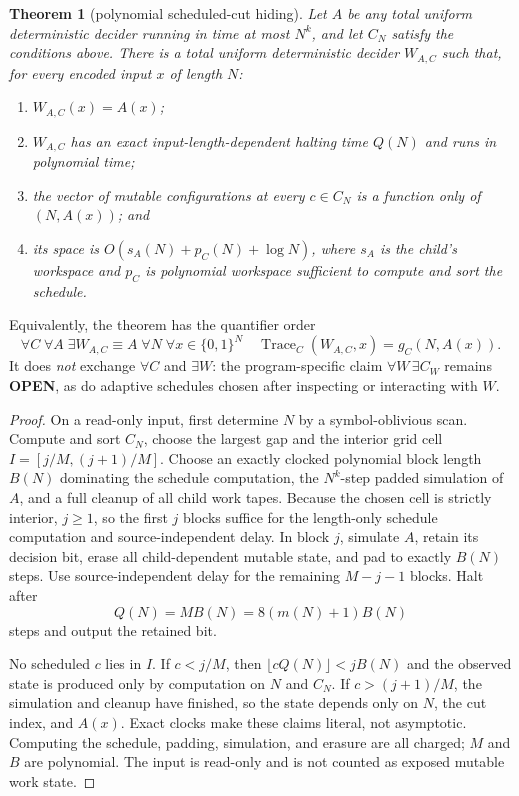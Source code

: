 \documentclass[11pt]{article}
\newtheorem{theorem}{Theorem}
\newcommand{\OPEN}{\textbf{OPEN}}
\begin{document}
\begin{theorem}[polynomial scheduled-cut hiding]
Let $A$ be any total uniform deterministic decider running in time at most $N^k$, and let
$C_N$ satisfy the conditions above.  There is a total uniform deterministic decider
$W_{A,C}$ such that, for every encoded input $x$ of length $N$:
\begin{enumerate}
\item $W_{A,C}(x)=A(x)$;
\item $W_{A,C}$ has an exact input-length-dependent halting time $Q(N)$ and runs in
polynomial time;
\item the vector of mutable configurations at every $c\in C_N$ is a function only of
$(N,A(x))$; and
\item its space is $O(s_A(N)+p_C(N)+\log N)$, where $s_A$ is the child's workspace and
$p_C$ is polynomial workspace sufficient to compute and sort the schedule.
\end{enumerate}
\end{theorem}
Equivalently, the theorem has the quantifier order
\[
 \forall C\;\forall A\;\exists W_{A,C}\equiv A\;\forall N\;\forall x\in\{0,1\}^N
 \quad \operatorname{Trace}_{C}(W_{A,C},x)=g_C(N,A(x)).
\]
It does \emph{not} exchange $\forall C$ and $\exists W$: the program-specific claim
$\forall W\,\exists C_W$ remains \OPEN, as do adaptive schedules chosen after inspecting
or interacting with $W$.

\begin{proof}
On a read-only input, first determine $N$ by a symbol-oblivious scan.  Compute and sort
$C_N$, choose the largest gap and the interior grid cell
$I=[j/M,(j+1)/M]$.  Choose an exactly clocked polynomial block length $B(N)$ dominating
the schedule computation, the $N^k$-step padded simulation of $A$, and a full cleanup of
all child work tapes.  Because the chosen cell is strictly interior, $j\ge1$, so the
first $j$ blocks suffice for the length-only schedule computation and source-independent
delay.  In block $j$, simulate $A$, retain its decision bit, erase all child-dependent
mutable state, and pad to exactly $B(N)$ steps.  Use source-independent delay for the
remaining $M-j-1$ blocks.  Halt after
\[
 Q(N)=M B(N)=8(m(N)+1)B(N)
\]
steps and output the retained bit.

No scheduled $c$ lies in $I$.  If $c<j/M$, then
$\lfloor cQ(N)\rfloor<jB(N)$ and the observed state is produced only by computation on
$N$ and $C_N$.  If $c>(j+1)/M$, the simulation and cleanup have finished, so the state
depends only on $N$, the cut index, and $A(x)$.  Exact clocks make these claims literal,
not asymptotic.  Computing the schedule, padding, simulation, and erasure are all charged;
$M$ and $B$ are polynomial.  The input is read-only and is not counted as exposed mutable
work state.
\end{proof}
\end{document}

